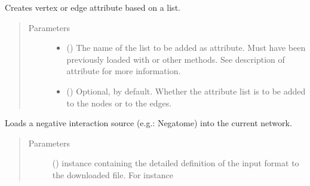 \documentclass[letterpaper,10pt,english]{sphinxmanual}
\begin{document}
\begin{fulllineitems}
\begin{fulllineitems}
\label{\detokenize{reference:pypath.main.PyPath.apply_list}}
Creates vertex or edge attribute based on a list.
\begin{quote}\begin{description}
\item[{Parameters}] \leavevmode\begin{itemize}
\item {} 
 () \textendash{} The name of the list to be added as attribute. Must have
been previously loaded with
{\hyperref[\detokenize{reference:pypath.main.PyPath.load_list}]{}} or other methods.
See description of 
attribute for more information.

\item {} 
 () \textendash{} Optional,  by default. Whether the attribute list
is to be added to the nodes or to the edges.

\end{itemize}

\end{description}\end{quote}

\end{fulllineitems}


\begin{fulllineitems}
\label{\detokenize{reference:pypath.main.PyPath.apply_negative}}
Loads a negative interaction source (e.g.: Negatome) into the
current network.
\begin{quote}\begin{description}
\item[{Parameters}] \leavevmode
{} () \textendash{}  instance
containing the detailed definition of the input format to
the downloaded file. For instance


\end{description}
\end{quote}
\end{fulllineitems}
\end{fulllineitems}
\end{document}
